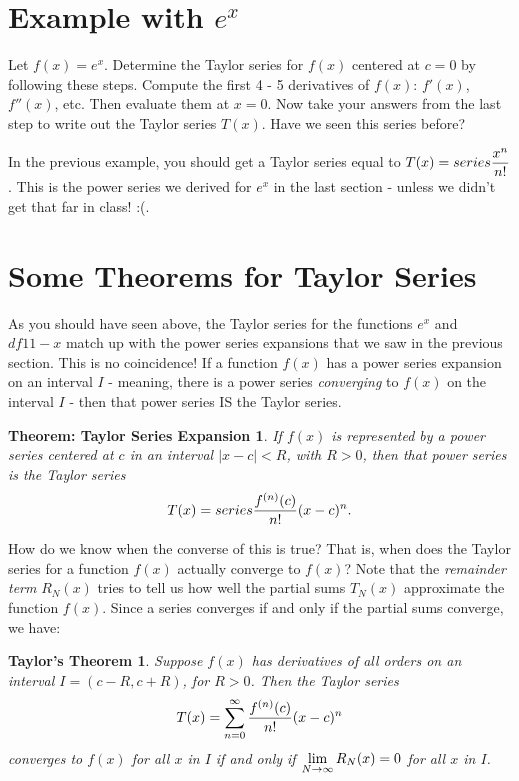 \documentclass{ximera}
\newcommand{\dsum}{\displaystyle \sum}
\newcommand{\dseries}{\dsum_{n=0}^{\infty}}
\newtheorem*{TaylorExpansion}{Theorem: Taylor Series Expansion}
\newtheorem*{TaylorsThm}{Taylor's Theorem}
\begin{document}
\section{Example with $e^x$}
	Let $f(x) = e^x$. Determine the Taylor series for $f(x)$ centered at $c=0$ by following these steps. 
 Compute the first 4 - 5 derivatives of $f(x)$: $f'(x)$, $f''(x)$, etc. Then evaluate them at $x=0$.
Now take your answers from the last step to write out the Taylor series $T(x)$. 
Have we seen this series before?
	
In the previous example, you should get a Taylor series equal to $T(x) = series \displaystyle\frac{x^n}{n!}$. This is the power series we derived for $e^x$ in the last section - unless we didn't get that far in class! :(.


\section*{Some Theorems for Taylor Series}

As you should have seen above, the Taylor series for the functions $e^x$ and $df{1}{1-x}$ match up with the power series expansions that we saw in the previous section. This is no coincidence! If a function $f(x)$ has a power series expansion on an interval $I$ - meaning, there is a power series \emph{converging} to $f(x)$ on the interval $I$ - then that power series IS the Taylor series.

	\begin{TaylorExpansion}
		If $f(x)$ is represented by a power series centered at $c$ in an interval $|x-c| < R$, with $R>0$, then that power series is the Taylor series
		\[
			T(x) = series \displaystyle\frac{f^{(n)}(c)}{n!}(x-c)^n.
		\]
	\end{TaylorExpansion}

How do we know when the converse of this is true? That is, when does the Taylor series for a function $f(x)$ actually converge to $f(x)$? Note that the \emph{remainder term} $R_N(x)$ tries to tell us how well the partial sums $T_N(x)$ approximate the function $f(x)$. Since a series converges if and only if the partial sums converge, we have:

	\begin{TaylorsThm}
		Suppose $f(x)$ has derivatives of all orders on an interval $I = (c-R, c+R)$, for $R>0$. Then the Taylor series
		\[
			T(x) = \dseries \df{f^{(n)}(c)}{n!}(x-c)^n
		\] 
		converges to $f(x)$ for all $x$ in $I$ if and only if $\displaystyle \lim_{N \to \infty} R_N(x) = 0$ for all $x$ in $I$.
	\end{TaylorsThm}
\end{document}
